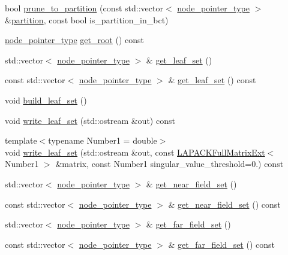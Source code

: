 \begin{DoxyCompactItemize}
\item 
bool \hyperlink{classBlockClusterTree_af1663a109b6fd5c67c85e9bb88a54a13}{prune\+\_\+to\+\_\+partition} (const std\+::vector$<$ \hyperlink{classTreeNode}{node\+\_\+pointer\+\_\+type} $>$ \&\hyperlink{classBlockClusterTree_a3ca42421f732c20fc07bdf5d5ab94319}{partition}, const bool is\+\_\+partition\+\_\+in\+\_\+bct)
\item 
\hyperlink{classTreeNode}{node\+\_\+pointer\+\_\+type} \hyperlink{classBlockClusterTree_a4a4f3b893380d1d7f53b772589a847d2}{get\+\_\+root} () const
\item 
std\+::vector$<$ \hyperlink{classTreeNode}{node\+\_\+pointer\+\_\+type} $>$ \& \hyperlink{classBlockClusterTree_a162b396d814b420f96289425529852e9}{get\+\_\+leaf\+\_\+set} ()
\item 
const std\+::vector$<$ \hyperlink{classTreeNode}{node\+\_\+pointer\+\_\+type} $>$ \& \hyperlink{classBlockClusterTree_a38c3d1ad3aa983ea1d0b711914664b4c}{get\+\_\+leaf\+\_\+set} () const
\item 
void \hyperlink{classBlockClusterTree_a1b3396fbedf6ec07cce9c23a62b2c30b}{build\+\_\+leaf\+\_\+set} ()
\item 
void \hyperlink{classBlockClusterTree_aef01b51b0530536bc5481492d4719375}{write\+\_\+leaf\+\_\+set} (std\+::ostream \&out) const
\item 
{\footnotesize template$<$typename Number1  = double$>$ }\\void \hyperlink{classBlockClusterTree_a652b1c53dff2794e2f18343bf3988e19}{write\+\_\+leaf\+\_\+set} (std\+::ostream \&out, const \hyperlink{classLAPACKFullMatrixExt}{L\+A\+P\+A\+C\+K\+Full\+Matrix\+Ext}$<$ Number1 $>$ \&matrix, const Number1 singular\+\_\+value\+\_\+threshold=0.) const
\item 
std\+::vector$<$ \hyperlink{classTreeNode}{node\+\_\+pointer\+\_\+type} $>$ \& \hyperlink{classBlockClusterTree_a82f61b31f1e9cf869831fa4c8232df81}{get\+\_\+near\+\_\+field\+\_\+set} ()
\item 
const std\+::vector$<$ \hyperlink{classTreeNode}{node\+\_\+pointer\+\_\+type} $>$ \& \hyperlink{classBlockClusterTree_a6ac71437177d14012c12f7b4f354cdd1}{get\+\_\+near\+\_\+field\+\_\+set} () const
\item 
std\+::vector$<$ \hyperlink{classTreeNode}{node\+\_\+pointer\+\_\+type} $>$ \& \hyperlink{classBlockClusterTree_a2980726dc3789773b5cd3c04df5e69a3}{get\+\_\+far\+\_\+field\+\_\+set} ()
\item 
const std\+::vector$<$ \hyperlink{classTreeNode}{node\+\_\+pointer\+\_\+type} $>$ \& \hyperlink{classBlockClusterTree_a93763855c84100e1a9da3080737295f4}{get\+\_\+far\+\_\+field\+\_\+set} () const

\end{DoxyCompactItemize}

